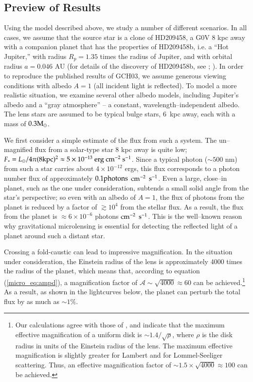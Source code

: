 \subsection{Preview of Results}
\label{micro_ssec:preview}
Using the model described above, we study a number of different
scenarios. In all cases, we assume that the source star is a clone of
HD209458, a G0V 8 kpc away with a companion planet that has the
properties of HD209458b, i.e. a ``Hot Jupiter,'' with radius $R_p =
1.35$ times the radius of Jupiter, and with orbital radius $a = 0.046$
AU (for details of the discovery of HD209458b, see
\citet{henry_et_al2000}; \citet{charbonneau_et_al2000}).  In order to
reproduce the published results of GCH03, we assume generous viewing
conditions with albedo $A = 1$ (all incident light is reflected).  To
model a more realistic situation, we examine several other albedo
models, including Jupiter's albedo and a ``gray atmosphere'' -- a
constant, wavelength--independent albedo.  The lens stars are assumed
to be typical bulge stars, 6~kpc away, each with a mass of $0.3{\rm
M_\odot}$.

We first consider a simple estimate of the flux from such a system.
The un--magnified flux from a solar-type star 8 kpc away is quite low;
$F_* = L_\odot / 4 \pi (8 \rm{kpc})^2 \approx 5 \times
10^{-13}~\rm{erg}~\rm{cm}^{-2}~\rm{s}^{-1}$. Since a typical photon
($\sim 500$ nm) from such a star carries about $4 \times 10^{-12}$
ergs, this flux corresponds to a photon number flux of approximately
$0.1 \rm{photons}$ $\rm{cm}^{-2}$ $\rm{s}^{-1}$.  Even a large,
close--in planet, such as the one under consideration, subtends a
small solid angle from the star's perspective; so even with an albedo
of $A=1$, the flux of photons from the planet is reduced by a factor
of $\gtrsim 10^4$ from the stellar flux. As a result, the flux from
the planet is $\approx 6 \times 10^{-6}$ photons $\rm{cm}^{-2}$
$\rm{s}^{-1}$.  This is the well--known reason why gravitational
microlensing is essential for detecting the reflected light of a
planet around such a distant star.

Crossing a fold-caustic can lead to impressive magnification.  In the
situation under consideration, the Einstein radius of the lens is
approximately 4000 times the radius of the planet, which means that,
according to equation (\ref{micro_eq:ampd}), a magnification factor of
$\mathcal{A} \sim \sqrt{4000} \approx 60$ can be
achieved.\footnote{Our calculations agree with those of
\citet{kayser+witt1989}, and indicate that the maximum effective
magnification of a uniform disk is $\sim 1.4/\sqrt{\rho}$, where
$\rho$ is the disk radius in units of the Einstein radius of the lens.
The maximum effective magnification is slightly greater for Lambert
and for Lommel-Seeliger scattering.  Thus, an effective magnification
factor of $\sim 1.5 \times \sqrt{4000} \approx 100$ can be achieved.}
As a result, as shown in the lightcurves below, the planet can perturb
the total flux by as much as $\sim 1\%$.

